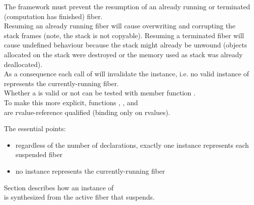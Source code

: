 \label{invalidation}

The framework must prevent the resumption of an already running or terminated
(computation has finished) fiber.\\
Resuming an already running fiber will cause overwriting and corrupting the stack
frames (note, the stack is not copyable).  Resuming a terminated fiber will
cause undefined behaviour because the stack might already be unwound (objects
allocated on the stack were destroyed or the memory used as stack was already
deallocated).\\
As a consequence each call of \resume will invalidate the \fiber instance, i.e.
no valid instance of \fiber represents the currently-running fiber.\\
Whether a \fiber is valid or not can be tested with member function \opbool.\\
To make this more explicit, functions \resume, \resumewith, \xtresume
and\\
\xtresumewith are rvalue-reference qualified (binding only on rvalues).

The essential points:
\begin{itemize}
    \item regardless of the number of \fiber declarations, exactly one \fiber
          instance represents each suspended fiber
    \item no \fiber instance represents the currently-running fiber
\end{itemize}

Section  describes how an instance of\\
\fiber is synthesized from the active fiber that suspends.\\

